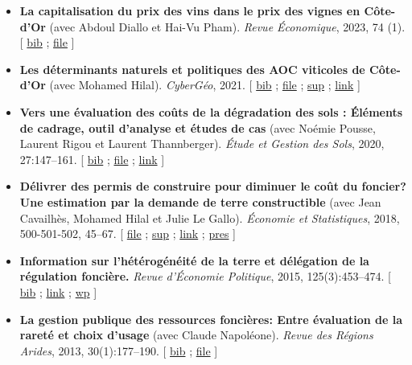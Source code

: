 \documentclass[11pt, a4paper]{./style}
\begin{document}
\begin{itemize}
\item \textbf{La capitalisation du prix des vins dans le prix des vignes en
Côte-d’Or} (avec Abdoul Diallo et Hai-Vu Pham). \emph{Revue
Économique}, 2023, 74 (1). [ \href{bib/DNPA.bib}{bib} ; \href{doc/VINPX-FILE.pdf}{file} ]
\item \textbf{Les déterminants naturels et politiques des AOC viticoles de
Côte-d’Or} (avec Mohamed Hilal). \emph{CyberGéo}, 2021. [ \href{bib/DNPA.bib}{bib} ; \href{doc/DNPA-FILE.pdf}{file} ;
\href{doc/DNPA-SUP.pdf}{sup} ; \href{https://journals.openedition.org/cybergeo/36443}{link} ]
\item \textbf{Vers une évaluation des coûts de la dégradation des sols :
Éléments de cadrage, outil d'analyse et études de cas} (avec
Noémie Pousse, Laurent Rigou et Laurent Thannberger). \emph{Étude et
Gestion des Sols}, 2020, 27:147--161. [ \href{bib/GPRF.bib}{bib} ; \href{doc/ECOSOL-FILE.pdf}{file} ; \href{https://www.afes.fr/publications/revue-etude-et-gestion-des-sols/volume-27-numero-1/}{link} ]
\item \textbf{Délivrer des permis de construire pour diminuer le coût du
foncier? Une estimation par la demande de terre constructible}
(avec Jean Cavailhès, Mohamed Hilal et Julie Le Gallo).
\emph{Économie et Statistiques}, 2018, 500-501-502, 45--67. [ \href{doc/PCPXf-FILE.pdf}{file} ;
\href{doc/PCPX-SUP.pdf}{sup} ; \href{https://insee.fr/fr/statistiques/3621977?sommaire=3622116}{link} ; \href{doc/PCPXf-PRES.pdf}{pres} ]
\item \textbf{Information sur l'hétérogénéité de la terre et délégation de la
régulation foncière.} \emph{Revue d'Économie Politique}, 2015,
125(3):453--474. [ \href{bib/IFHT.bib}{bib} ; \href{https://www.cairn.info/revue-d-economie-politique-2015-3-page-453.htm}{link} ; \href{http://ideas.repec.org/p/ceo/wpaper/32.html}{wp} ]
\item \textbf{La gestion publique des ressources foncières: Entre évaluation
de la rareté et choix d'usage} (avec Claude Napoléone). \emph{Revue
des Régions Arides}, 2013, 30(1):177--190. [ \href{bib/GPRF.bib}{bib} ; \href{https://www.researchgate.net/profile/Claude\_Napoleone/publication/268075060\_La\_gestion\_publique\_des\_ressources\_foncieres\_entre\_evaluation\_de\_la\_rarete\_et\_choix\_d'usages/links/5460bdd20cf295b5616376de/La-gestion-publique-des-ressources-foncieres-entre-evaluation-de-la-rarete-et-choix-dusages.pdf}{file} ]
\end{itemize}
\end{document}
